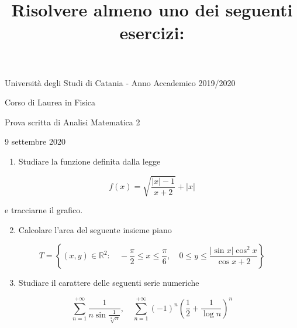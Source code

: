 \documentclass[10pt]{article}
\title{Risolvere almeno uno dei seguenti esercizi: }
\author{}
\date{}
\begin{document}
\maketitle
Università degli Studi di Catania - Anno Accademico 2019/2020

Corso di Laurea in Fisica

Prova scritta di Analisi Matematica 2

9 settembre 2020

\begin{enumerate}
  \item Studiare la funzione definita dalla legge
\end{enumerate}

\[
f(x)=\sqrt{\frac{|x|-1}{x+2}}+|x|
\]

e tracciarne il grafico.

\begin{enumerate}
  \setcounter{enumi}{1}
  \item Calcolare l'area del seguente insieme piano
\end{enumerate}

\[
T=\left\{(x, y) \in \mathbb{R}^{2}: \quad-\frac{\pi}{2} \leq x \leq \frac{\pi}{6}, \quad 0 \leq y \leq \frac{|\sin x| \cos ^{2} x}{\cos x+2}\right\}
\]

\begin{enumerate}
  \setcounter{enumi}{2}
  \item Studiare il carattere delle seguenti serie numeriche
\end{enumerate}

\[
\sum_{n=1}^{+\infty} \frac{1}{n \sin \frac{1}{\sqrt[3]{n}}}, \quad \sum_{n=1}^{+\infty}(-1)^{n}\left(\frac{1}{2}+\frac{1}{\log n}\right)^{n}
\]
\end{document}
